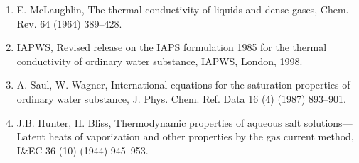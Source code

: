 \documentclass[11pt]{article}
\begin{document}
\begin{enumerate}
\item E. McLaughlin, The thermal conductivity of liquids and dense gases, Chem. Rev. 64 (1964) 389--428.
\item IAPWS, Revised release on the IAPS formulation 1985 for the thermal conductivity of ordinary water substance, IAPWS, London, 1998.
\item A. Saul, W. Wagner, International equations for the saturation properties of ordinary water substance, J. Phys. Chem. Ref. Data 16 (4) (1987) 893--901.
\item J.B. Hunter, H. Bliss, Thermodynamic properties of aqueous salt solutions---Latent heats of vaporization and other properties by the gas current method, I\&EC 36 (10) (1944) 945--953.
\end{enumerate}
\end{document}
